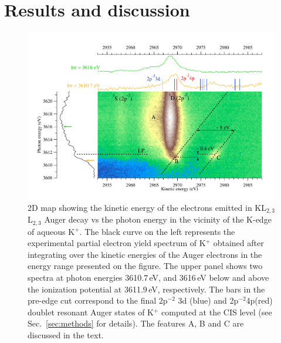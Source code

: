 \section{Results and discussion}\label{sec:rnd}

\begin{figure}%
\centering
\includegraphics[scale=0.55]{figures/k_2dmap.pdf}
\caption{2D map showing the kinetic energy of the electrons emitted in KL$_{2,3}$L$_{2,3}$ Auger decay vs the photon energy in the vicinity of the K-edge of aqueous K$^{+}$. The black curve on the left represents the experimental partial electron yield spectrum of K$^{+}$ obtained after integrating over the kinetic energies of the Auger electrons in the energy range presented on the figure. The upper panel shows two spectra at photon energies 3610.7\,eV, and 3616\,eV below and above the ionization potential at 3611.9\,eV, respectively. The bars in the pre-edge cut correspond to the final 2p$^{-2}$ 3d (blue) and 2p$^{-2}$4p(red) doublet resonant Auger states of K$^{+}$ computed at the CIS level (see Sec.\ \ref{sec:methods} for details). The features A, B and C are discussed in the text.}
\label{fg:2dmap_k}
\end{figure}


